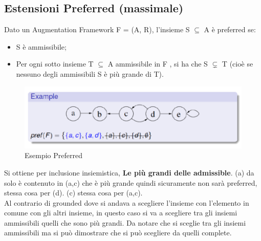 \subsection{Estensioni Preferred (massimale)}
Dato un Augmentation Framework F = (A, R), l'insieme S $\subseteq$ A è preferred se:
\begin{itemize}
    \item S è ammissibile;
    \item Per ogni sotto insieme T $\subseteq$ A ammissibile in F , si ha che S $\subsetneq$ T (cioè se nessuno degli ammissibili S è più grande di T).
\end{itemize}
\begin{figure}[H]
    \centering
    \includegraphics[width=12cm, keepaspectratio]{img/Cap6/prefered.png}
    \caption{Esempio Preferred}
\end{figure}
Si ottiene per inclusione insiemistica, \textbf{Le più grandi delle admissible}. (a) da solo è contenuto in (a,c) che è più grande quindi sicuramente non sarà preferred, stessa cosa per (d). (c) stessa cosa per (a,c).
\\Al contrario di grounded dove si andava a scegliere l'insieme con l'elemento in
comune con gli altri insieme, in questo caso si va a scegliere tra gli insiemi ammissibili
quelli che sono più grandi. Da notare che si sceglie tra gli insiemi ammissibili ma si
può dimostrare che si può scegliere da quelli complete.

